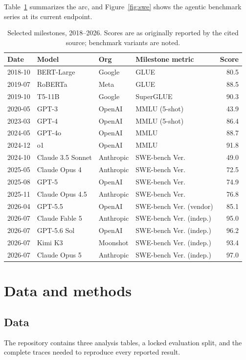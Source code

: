 \documentclass[11pt]{article}
\begin{document}
Table~\ref{tab:timeline} summarizes the arc, and Figure~\ref{fig:swe} shows
the agentic benchmark series at its current endpoint.

\begin{table}[t]
\centering
\caption{Selected milestones, 2018--2026. Scores are as originally reported by
the cited source; benchmark variants are noted.}\label{tab:timeline}
\small
\begin{tabular}{@{}llllr@{}}
\toprule
Date & Model & Org & Milestone metric & Score \\
\midrule
2018-10 & BERT-Large & Google & GLUE & 80.5 \\
2019-07 & RoBERTa & Meta & GLUE & 88.5 \\
2019-10 & T5-11B & Google & SuperGLUE & 90.3 \\
2020-05 & GPT-3 & OpenAI & MMLU (5-shot) & 43.9 \\
2023-03 & GPT-4 & OpenAI & MMLU (5-shot) & 86.4 \\
2024-05 & GPT-4o & OpenAI & MMLU & 88.7 \\
2024-12 & o1 & OpenAI & MMLU & 91.8 \\
2024-10 & Claude 3.5 Sonnet & Anthropic & SWE-bench Ver. & 49.0 \\
2025-05 & Claude Opus 4 & Anthropic & SWE-bench Ver. & 72.5 \\
2025-08 & GPT-5 & OpenAI & SWE-bench Ver. & 74.9 \\
2025-11 & Claude Opus 4.5 & Anthropic & SWE-bench Ver. & 76.8 \\
2026-04 & GPT-5.5 & OpenAI & SWE-bench Ver. (vendor) & 85.1 \\
2026-07 & Claude Fable 5 & Anthropic & SWE-bench Ver. (indep.) & 95.0 \\
2026-07 & GPT-5.6 Sol & OpenAI & SWE-bench Ver. (indep.) & 96.2 \\
2026-07 & Kimi K3 & Moonshot & SWE-bench Ver. (indep.) & 93.4 \\
2026-07 & Claude Opus 5 & Anthropic & SWE-bench Ver. (indep.) & 97.0 \\
\bottomrule
\end{tabular}
\end{table}

\section{Data and methods}\label{sec:methods}

\subsection{Data}
The repository contains three analysis tables, a locked evaluation split, and
the complete traces needed to reproduce every reported result.
\end{document}
